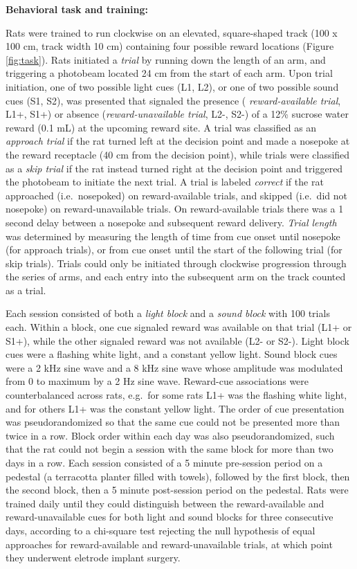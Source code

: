 \documentclass[11pt]{article}
\begin{document}
{\bf Behavioral task and training:}

Rats were trained to run clockwise on an elevated, square-shaped track (100 x
100 cm, track width 10 cm) containing four possible reward locations (Figure
\ref{fig:task}). Rats initiated a {\it trial} by running down the length of an
arm, and triggering a photobeam located 24 cm from the start of each arm. Upon
trial initiation, one of two possible light cues (L1, L2), or one of two
possible sound cues (S1, S2), was presented that signaled the presence ({\it
  reward-available trial}, L1+, S1+) or absence ({\it reward-unavailable trial},
L2-, S2-) of a 12\% sucrose water reward (0.1 mL) at the upcoming reward site. A
trial was classified as an {\it approach trial} if the rat turned left at the
decision point and made a nosepoke at the reward receptacle (40 cm from the
decision point), while trials were classified as a {\it skip trial} if the rat
instead turned right at the decision point and triggered the photobeam to
initiate the next trial. A trial is labeled {\it correct} if the rat approached
(i.e.\ nosepoked) on reward-available trials, and skipped (i.e.\ did not
nosepoke) on reward-unavailable trials. On reward-available trials there was a 1
second delay between a nosepoke and subsequent reward delivery. {\it Trial
  length} was determined by measuring the length of time from cue onset until
nosepoke (for approach trials), or from cue onset until the start of the
following trial (for skip trials). Trials could only be initiated through
clockwise progression through the series of arms, and each entry into the
subsequent arm on the track counted as a trial.

Each session consisted of both a {\it light block} and a {\it sound block} with
100 trials each. Within a block, one cue signaled reward was available on that
trial (L1+ or S1+), while the other signaled reward was not available (L2- or
S2-). Light block cues were a flashing white light, and a constant yellow
light. Sound block cues were a 2 kHz sine wave and a 8 kHz sine wave whose
amplitude was modulated from 0 to maximum by a 2 Hz sine wave. Reward-cue
associations were counterbalanced across rats, e.g.\ for some rats L1+ was the
flashing white light, and for others L1+ was the constant yellow light. The
order of cue presentation was pseudorandomized so that the same cue could not be
presented more than twice in a row. Block order within each day was also
pseudorandomized, such that the rat could not begin a session with the same
block for more than two days in a row. Each session consisted of a 5 minute
pre-session period on a pedestal (a terracotta planter filled with towels),
followed by the first block, then the second block, then a 5 minute post-session
period on the pedestal. Rats were trained daily until they could distinguish
between the reward-available and reward-unavailable cues for both light and
sound blocks for three consecutive days, according to a chi-square test
rejecting the null hypothesis of equal approaches for reward-available and
reward-unavailable trials, at which point they underwent eletrode implant
surgery.
\end{document}
